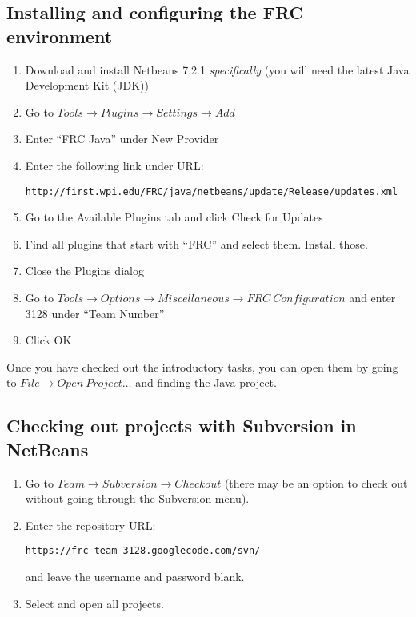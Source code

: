 \documentclass[a4paper]{article}
\begin{document}
\subsection{Installing and configuring the FRC environment}
\begin{enumerate}
\item{Download and install Netbeans 7.2.1 \textit{specifically} (you will need the latest Java Development Kit (JDK))}
\item{Go to $Tools \rightarrow Plugins \rightarrow Settings \rightarrow Add$}
\item{Enter ``FRC Java'' under New Provider}
\item{Enter the following link under URL: \begin{verbatim}http://first.wpi.edu/FRC/java/netbeans/update/Release/updates.xml\end{verbatim}}
\item{Go to the Available Plugins tab and click Check for Updates}
\item{Find all plugins that start with ``FRC'' and select them. Install those.}
\item{Close the Plugins dialog}
\item{Go to $Tools\rightarrow Options\rightarrow Miscellaneous\rightarrow FRC\ Configuration$ and enter 3128 under ``Team Number''}
\item{Click OK}
\end{enumerate}

Once you have checked out the introductory tasks, you can open them by going to $File\rightarrow Open\ Project\ldots$ and finding the Java project.

\subsection{Checking out projects with Subversion in NetBeans}
\begin{enumerate}
\item{Go to $Team\rightarrow Subversion\rightarrow Checkout$ (there may be an option to check out without going through the Subversion menu).}
\item{Enter the repository URL:\begin{verbatim}https://frc-team-3128.googlecode.com/svn/\end{verbatim} and leave the username and password blank.}
\item{Select and open all projects.}
\end{enumerate}
\end{document}

